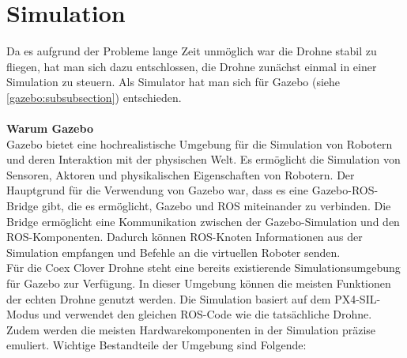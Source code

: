 \section{Simulation} \label{simulation:section}
Da es aufgrund der Probleme lange Zeit unmöglich war die Drohne stabil zu fliegen, hat man sich dazu entschlossen, die Drohne zunächst einmal in einer Simulation zu steuern. Als Simulator hat man sich für Gazebo (siehe \ref{gazebo:subsubsection}) entschieden. \\
\\
\textbf{Warum Gazebo}\\
Gazebo bietet eine hochrealistische Umgebung für die Simulation von Robotern und deren Interaktion mit der physischen Welt. Es ermöglicht die Simulation von Sensoren, Aktoren und physikalischen Eigenschaften von Robotern. Der Hauptgrund für die Verwendung von Gazebo war, dass es eine Gazebo-ROS-Bridge gibt, die es ermöglicht, Gazebo und ROS miteinander zu verbinden. Die Bridge ermöglicht eine Kommunikation zwischen der Gazebo-Simulation und den ROS-Komponenten. Dadurch können ROS-Knoten Informationen aus der Simulation empfangen und Befehle an die virtuellen Roboter senden. \\

Für die Coex Clover Drohne steht eine bereits existierende Simulationsumgebung für Gazebo zur Verfügung. In dieser Umgebung können die meisten Funktionen der echten Drohne genutzt werden. Die Simulation basiert auf dem PX4-SIL-Modus und verwendet den gleichen ROS-Code wie die tatsächliche Drohne. Zudem werden die meisten Hardwarekomponenten in der Simulation präzise emuliert. Wichtige Bestandteile der Umgebung sind Folgende:

